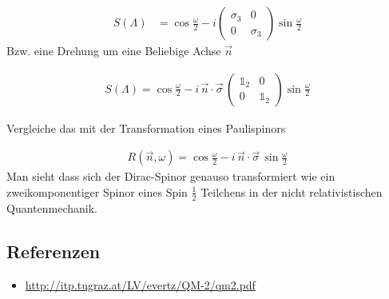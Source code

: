 \begin{align}
  \label{eq:46}
   S(\Lambda)&= \cos\frac{\omega}{2}-i  \begin{pmatrix}\sigma_3&0\\0&\sigma_3\end{pmatrix}\sin\frac{\omega}{2}
\end{align}
Bzw. eine Drehung um eine Beliebige Achse \(\vec n\)

\begin{align}
  \label{eq:47}
   \boxed{S(\Lambda) = \cos\frac{\omega}{2}-i\, \vec n\cdot\vec\sigma\,\begin{pmatrix}\mathds 1_2&0\\0&\mathds 1_2\end{pmatrix}\sin\frac{\omega}{2}}
\end{align}

Vergleiche das mit der Transformation eines Paulispinors

\begin{align}
  \label{eq:48}
  R(\vec n,\omega) = \cos\frac{\omega}{2}-i\, \vec n\cdot\vec\sigma\,\sin\frac{\omega}{2}
\end{align}
Man sieht dass sich der Dirac-Spinor genauso transformiert wie ein zweikomponentiger Spinor eines Spin \(\frac{1}{2}\) Teilchens in der nicht relativistischen Quantenmechanik.


\subsection*{Referenzen}
\begin{itemize}
\item \url{ http://itp.tugraz.at/LV/evertz/QM-2/qm2.pdf }
\end{itemize}


